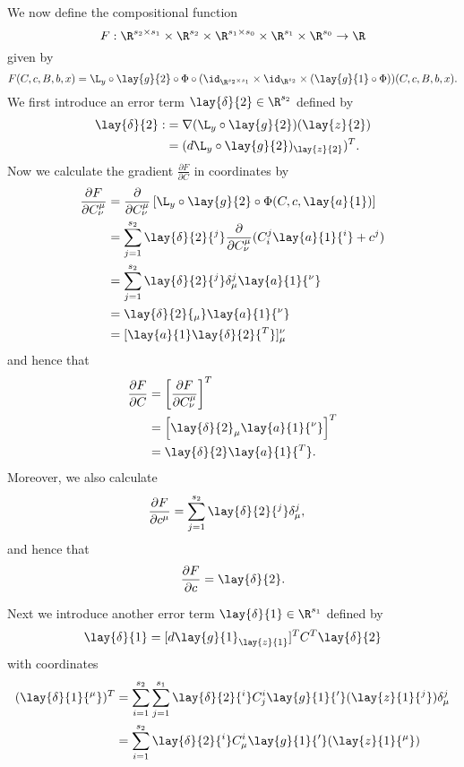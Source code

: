 We now define the compositional function
$$F:\R^{s_2\times s_1}\times \R^{s_2}\times \R^{s_1\times s_0}\times \R^{s_1}\times \R^{s_0}\to\R$$
given by
$$F(C,c,B,b,x)=\L_y\circ\lay{g}{2}\circ\Phi\circ(\id_{\R^{s_2\times s_1}}\times\id_{\R^{s_2}}\times (\lay{g}{1}\circ\Phi))(C,c,B,b,x).$$
We first introduce an error term $\lay{\delta}{2}\in\R^{s_2}$ defined by
\begin{align*}
	\lay{\delta}{2}:&=\nabla (\L_y\circ\lay{g}{2})(\lay{z}{2})\\
	&=(d\L_y\circ\lay{g}{2})_{\lay{z}{2}})^T.
\end{align*}
Now we calculate the gradient $\frac{\partial F}{\partial C}$ in coordinates by
\begin{align*}
	\frac{\partial F}{\partial C^\mu_\nu}&=\frac{\partial}{\partial C^\mu_\nu}\left[\L_y\circ\lay{g}{2}\circ\Phi(C,c,\lay{a}{1})\right]\\
	&=\sum_{j=1}^{s_2}\lay{\delta}{2}{^j}\frac{\partial}{\partial C^\mu_\nu}(C^j_i\lay{a}{1}{^i}+c^j)\\
	&=\sum_{j=1}^{s_2}\lay{\delta}{2}{^j}\delta^j_\mu \lay{a}{1}{^\nu}\\
	&=\lay{\delta}{2}{_\mu}\lay{a}{1}{^\nu}\\
	&=[\lay{a}{1}\lay{\delta}{2}{^T}]_\mu^\nu
\end{align*}
and hence that
\begin{align*}
	\frac{\partial F}{\partial C}&=\left[
		\frac{\partial F}{\partial C^\mu_\nu}
	\right]^T\\
	&=\left[\lay{\delta}{2}_\mu \lay{a}{1}{^\nu}\right]^T\\
	&=\lay{\delta}{2}\lay{a}{1}{^T}.
\end{align*}
Moreover, we also calculate
\begin{align*}
	\frac{\partial F}{\partial c^\mu}&=\sum_{j=1}^{s_2}\lay{\delta}{2}{^j}\delta^j_\mu,
\end{align*}
and hence that
$$\frac{\partial F}{\partial c}=\lay{\delta}{2}.$$

Next we introduce another error term $\lay{\delta}{1}\in\R^{s_1}$ defined by
\begin{align*}
	\lay{\delta}{1}=[d\lay{g}{1}_{\lay{z}{1}}]^TC^T\lay{\delta}{2}
\end{align*}
with coordinates
\begin{align*}
	(\lay{\delta}{1}{^\mu})^T&=\sum_{i=1}^{s_2}\sum_{j=1}^{s_1}\lay{\delta}{2}{^i}C^i_j\lay{g}{1}{'}(\lay{z}{1}{^j})\delta^j_\mu\\
	&=\sum_{i=1}^{s_2}\lay{\delta}{2}{^i}C^i_\mu\lay{g}{1}{'}(\lay{z}{1}{^\mu})
\end{align*}

